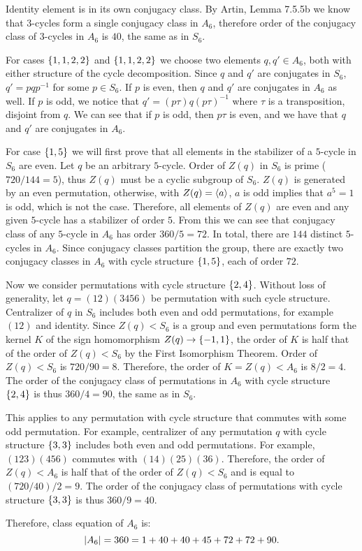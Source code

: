 \documentclass{article}
\theoremstyle{definition}
\DeclarePairedDelimiter\set{\{}{\}}
\DeclarePairedDelimiter\abs{\lvert}{\rvert}
\DeclarePairedDelimiter\genby{\langle}{\rangle}
\begin{document}
Identity element is in its own conjugacy class.
By Artin, Lemma 7.5.5b we know that $3$-cycles form a single conjugacy class in $A_6$, therefore order of the conjugacy class of $3$-cycles in $A_6$ is $40$, the same as in $S_6$.

For cases $\set{1,1,2,2}$ and $\set{1,1,2,2}$ we choose two elements $q, q' \in A_6$, both with either structure of the cycle decomposition.
Since $q$ and $q'$ are conjugates in $S_6$, $q' = p q p^{-1}$ for some $p \in S_6$.
If $p$ is even, then $q$ and $q'$ are conjugates in $A_6$ as well.
If $p$ is odd, we notice that $q' = (p \tau) q (p \tau)^{-1}$ where $\tau$ is a transposition, disjoint from $q$.
We can see that if $p$ is odd, then $p \tau$ is even, and we have that $q$ and $q'$ are conjugates in $A_6$.

For case $\set{1,5}$ we will first prove that all elements in the stabilizer of a $5$-cycle in $S_6$ are even.
Let $q$ be an arbitrary $5$-cycle.
Order of $Z(q)$ in $S_6$ is prime ($720 / 144 = 5$), thus $Z(q)$ must be a cyclic subgroup of $S_6$.
$Z(q)$ is generated by an even permutation, otherwise, with $Z(q) = \genby{a}$, $a$ is odd implies that $a^5 = 1$ is odd, which is not the case.
Therefore, all elements of $Z(q)$ are even and any given $5$-cycle has a stabilizer of order $5$.
From this we can see that conjugacy class of any $5$-cycle in $A_6$ has order $360 / 5 = 72$.
In total, there are $144$ distinct $5$-cycles in $A_6$.
Since conjugacy classes partition the group, there are exactly two conjugacy classes in $A_6$ with cycle structure $\set{1,5}$, each of order $72$.

Now we consider permutations with cycle structure $\set{2,4}$.
Without loss of generality, let $q = (12)(3456)$ be permutation with such cycle structure.
Centralizer of $q$ in $S_6$ includes both even and odd permutations, for example $(12)$ and identity.
Since $Z(q) < S_6$ is a group and even permutations form the kernel $K$ of the sign homomorphism $Z(q) \to \set{-1,1}$, the order of $K$ is half that of the order of $Z(q) < S_6$ by the First Isomorphism Theorem.
Order of $Z(q) < S_6$ is $720/90 = 8$.
Therefore, the order of $K = Z(q) < A_6$ is $8 / 2 = 4$.
The order of the conjugacy class of permutations in $A_6$ with cycle structure $\set{2,4}$ is thus $360 / 4 = 90$, the same as in $S_6$.

This applies to any permutation with cycle structure that commutes with some odd permutation.
For example, centralizer of any permutation $q$ with cycle structure $\set{3,3}$ includes both even and odd permutations.
For example, $(123)(456)$ commutes with $(14)(25)(36)$.
Therefore, the order of $Z(q) < A_6$ is half that of the order of $Z(q) < S_6$ and is equal to $(720/40)/2 = 9$.
The order of the conjugacy class of permutations with cycle structure $\set{3,3}$ is thus $360 / 9 = 40$.

Therefore, class equation of $A_6$ is:
\[ \abs{A_6} = 360 = 1 + 40 + 40 + 45 + 72 + 72 + 90. \]
\end{document}
